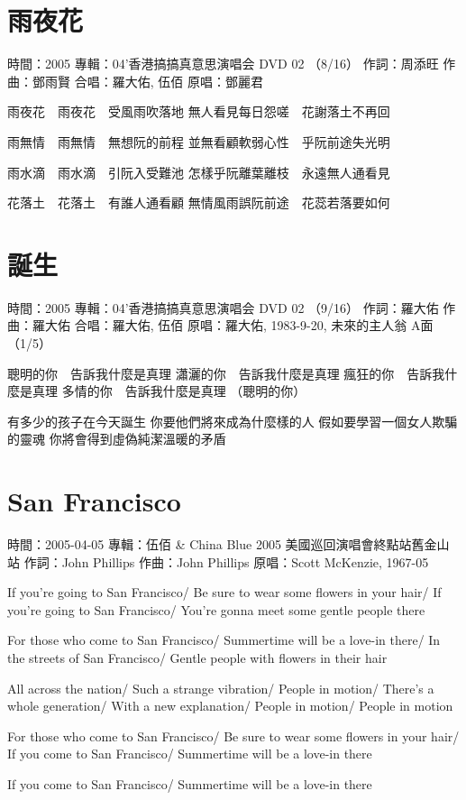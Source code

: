 \documentclass[UTF8,a4paper,oneside,twocolumn,12pt]{ctexbook}
\newcommand{\infopair}[2]{\textbullet #1：#2}
\newcommand{\zc}[1][伍佰]{\infopair{作詞}{#1}}
\newcommand{\zq}[1][伍佰]{\infopair{作曲}{#1}}
\newcommand{\zj}[1]{\infopair{專輯}{#1}}
\newcommand{\yc}[1]{\infopair{原唱}{#1}}
\newcommand{\sj}[1]{\infopair{時間}{#1}}
\newenvironment{info}{\begin{flushleft}\kaishu
	}
	{\end{flushleft}\normalsize\yahei\par}
\newenvironment{lyric}{
	}
{}
\begin{document}
\section{雨夜花}
\begin{info}
	\sj{2005}
	\zj{04'香港搞搞真意思演唱会 DVD 02 （8/16）}
	\zc[周添旺]
	\zq[鄧雨賢]
	\infopair{合唱}{羅大佑, 伍佰}
	\yc{鄧麗君}
\end{info}
\begin{lyric}
	雨夜花　雨夜花　受風雨吹落地
	無人看見每日怨嗟　花謝落土不再回

	雨無情　雨無情　無想阮的前程
	並無看顧軟弱心性　乎阮前途失光明

	雨水滴　雨水滴　引阮入受難池
	怎樣乎阮離葉離枝　永遠無人通看見

	花落土　花落土　有誰人通看顧
	無情風雨誤阮前途　花蕊若落要如何
\end{lyric}

\section{誕生}
\begin{info}
	\sj{2005}
	\zj{04'香港搞搞真意思演唱会 DVD 02 （9/16）}
	\zc[羅大佑]
	\zq[羅大佑]
	\infopair{合唱}{羅大佑, 伍佰}
	\yc{羅大佑, 1983-9-20, 未來的主人翁 A面（1/5）}
\end{info}
\begin{lyric}
	聰明的你　告訴我什麼是真理
	瀟灑的你　告訴我什麼是真理
	瘋狂的你　告訴我什麼是真理
	多情的你　告訴我什麼是真理
	（聰明的你）

	有多少的孩子在今天誕生
	你要他們將來成為什麼樣的人
	假如要學習一個女人欺騙的靈魂
	你將會得到虛偽純潔溫暖的矛盾
\end{lyric}

\section{San Francisco}%
\begin{info}
	\sj{2005-04-05}%
	\zj{伍佰 \& China Blue 2005 美國巡回演唱會終點站舊金山站}
	\zc[John Phillips]
	\zq[John Phillips]
	\yc{Scott McKenzie, 1967-05}
\end{info}
\begin{lyric}
	If you're going to San Francisco/
	Be sure to wear some flowers in your hair/
	If you're going to San Francisco/
	You're gonna meet some gentle people there

	For those who come to San Francisco/
	Summertime will be a love-in there/
	In the streets of San Francisco/
	Gentle people with flowers in their hair

	All across the nation/
	Such a strange vibration/
	People in motion/
	There's a whole generation/
	With a new explanation/
	People in motion/
	People in motion

	For those who come to San Francisco/
	Be sure to wear some flowers in your hair/
	If you come to San Francisco/
	Summertime will be a love-in there

	If you come to San Francisco/
	Summertime will be a love-in there
\end{lyric}
\end{document}
